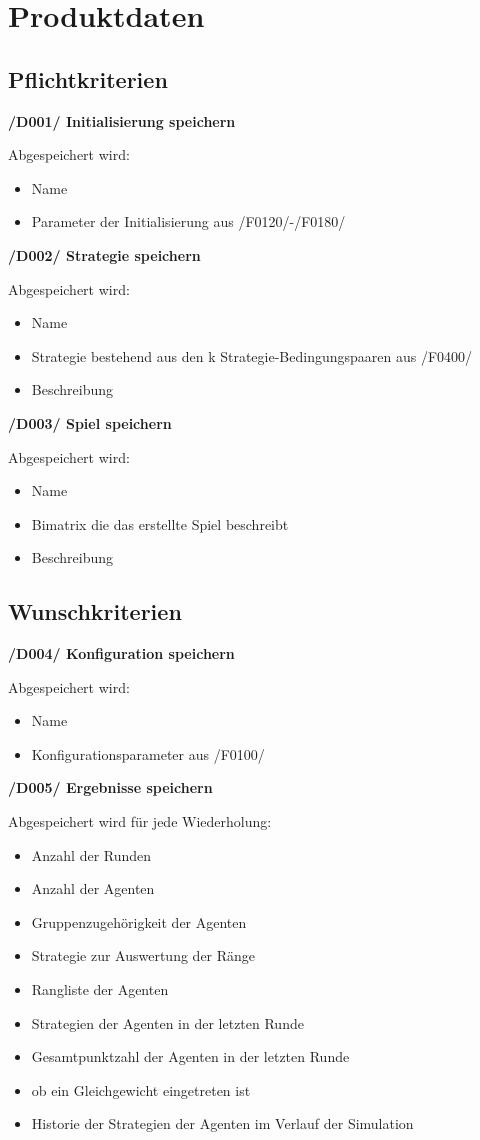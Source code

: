 \section{Produktdaten}

\subsection{Pflichtkriterien}

\textbf{/D001/ Initialisierung speichern}

Abgespeichert wird:
\begin{itemize}
\item Name
\item Parameter der Initialisierung aus /F0120/-/F0180/
\end{itemize}

\textbf{/D002/ Strategie speichern}

Abgespeichert wird:
\begin{itemize}
\item Name
\item Strategie bestehend aus den k Strategie-Bedingungspaaren aus /F0400/ 
\item Beschreibung
\end{itemize}

\textbf{/D003/ Spiel speichern}

Abgespeichert wird:
\begin{itemize}
\item Name 
\item Bimatrix die das erstellte Spiel beschreibt
\item Beschreibung
\end{itemize}

\subsection{Wunschkriterien}

\textbf{/D004/ Konfiguration speichern}

Abgespeichert wird:
\begin{itemize}
\item Name
\item Konfigurationsparameter aus /F0100/
\end{itemize}

\textbf{/D005/ Ergebnisse speichern}	

Abgespeichert wird für jede Wiederholung:
\begin{itemize}
\item Anzahl der Runden
\item Anzahl der Agenten
\item Gruppenzugehörigkeit der Agenten
\item Strategie zur Auswertung der Ränge
\item Rangliste der Agenten
\item Strategien der Agenten in der letzten Runde
\item Gesamtpunktzahl der Agenten in der letzten Runde
\item ob ein Gleichgewicht eingetreten ist
\item Historie der Strategien der Agenten im Verlauf der Simulation
\end{itemize}
